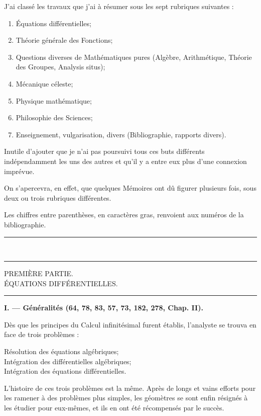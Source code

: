 \documentclass[11pt]{article}
\newcommand{\ornament}{\begin{center}\rule{2.5em}{0.4pt}\,\raisebox{0.1ex}{\tiny$\bullet\bullet\bullet$}\,\rule{2.5em}{0.4pt}\end{center}}
\newcommand{\shortline}{\begin{center}\rule{3.5em}{0.4pt}\end{center}}
\begin{document}
J’ai classé les travaux que j’ai à résumer sous les sept rubriques suivantes :

\begin{enumerate}[label=\arabic*\textsuperscript{o}, leftmargin=3em, itemsep=0pt]
\item Équations différentielles;
\item Théorie générale des Fonctions;
\item Questions diverses de Mathématiques pures (Algèbre, Arithmétique, Théorie des Groupes, Analysis situs);
\item Mécanique céleste;
\item Physique mathématique;
\item Philosophie des Sciences;
\item Enseignement, vulgarisation, divers (Bibliographie, rapports divers).
\end{enumerate}

Inutile d’ajouter que je n’ai pas poursuivi tous ces buts différents indépendamment les uns des autres et qu’il y a entre eux plus d’une connexion imprévue.

On s’apercevra, en effet, que quelques Mémoires ont dû figurer plusieurs fois, sous deux ou trois rubriques différentes.

Les chiffres entre parenthèses, en caractères gras, renvoient aux numéros de la bibliographie.

\ornament

\begin{center}
{\Large PREMIÈRE PARTIE.}\\[0.4em]
{\large ÉQUATIONS DIFFÉRENTIELLES.}
\end{center}
\shortline

\begin{center}
\textbf{I. — Généralités (64, 78, 83, 57, 73, 182, 278, Chap. II).}
\end{center}

Dès que les principes du Calcul infinitésimal furent établis, l’analyste se trouva en face de trois problèmes :

\begin{center}
Résolution des équations algébriques;\\
Intégration des différentielles algébriques;\\
Intégration des équations différentielles.
\end{center}

L’histoire de ces trois problèmes est la même. Après de longs et vains efforts pour les ramener à des problèmes plus simples, les géomètres se sont enfin résignés à les étudier pour eux-mêmes, et ils en ont été récompensés par le succès.
\end{document}
